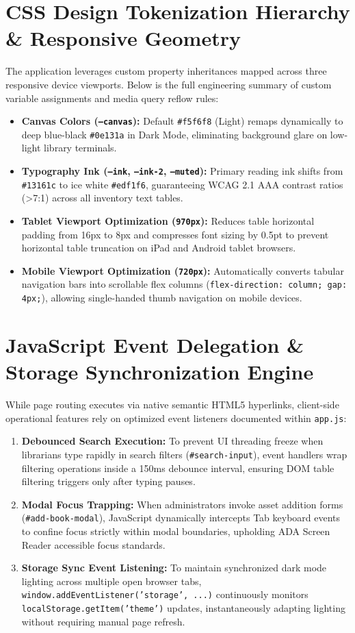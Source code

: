 \documentclass[11pt,a4paper]{report}
\begin{document}
\section{CSS Design Tokenization Hierarchy \& Responsive Geometry}
The application leverages custom property inheritances mapped across three responsive device viewports. Below is the full engineering summary of custom variable assignments and media query reflow rules:
\begin{itemize}[leftmargin=1.5em]
    \item \textbf{Canvas Colors (\texttt{--canvas}):} Default \texttt{\#f5f6f8} (Light) remaps dynamically to deep blue-black \texttt{\#0e131a} in Dark Mode, eliminating background glare on low-light library terminals.
    \item \textbf{Typography Ink (\texttt{--ink}, \texttt{--ink-2}, \texttt{--muted}):} Primary reading ink shifts from \texttt{\#13161c} to ice white \texttt{\#edf1f6}, guaranteeing WCAG 2.1 AAA contrast ratios (>7:1) across all inventory text tables.
    \item \textbf{Tablet Viewport Optimization (\texttt{970px}):} Reduces table horizontal padding from 16px to 8px and compresses font sizing by 0.5pt to prevent horizontal table truncation on iPad and Android tablet browsers.
    \item \textbf{Mobile Viewport Optimization (\texttt{720px}):} Automatically converts tabular navigation bars into scrollable flex columns (\texttt{flex-direction: column; gap: 4px;}), allowing single-handed thumb navigation on mobile devices.
\end{itemize}

\section{JavaScript Event Delegation \& Storage Synchronization Engine}
While page routing executes via native semantic HTML5 hyperlinks, client-side operational features rely on optimized event listeners documented within \texttt{app.js}:
\begin{enumerate}[leftmargin=1.5em]
    \item \textbf{Debounced Search Execution:} To prevent UI threading freeze when librarians type rapidly in search filters (\texttt{\#search-input}), event handlers wrap filtering operations inside a 150ms debounce interval, ensuring DOM table filtering triggers only after typing pauses.
    \item \textbf{Modal Focus Trapping:} When administrators invoke asset addition forms (\texttt{\#add-book-modal}), JavaScript dynamically intercepts Tab keyboard events to confine focus strictly within modal boundaries, upholding ADA Screen Reader accessible focus standards.
    \item \textbf{Storage Sync Event Listening:} To maintain synchronized dark mode lighting across multiple open browser tabs, \texttt{window.addEventListener('storage', ...)} continuously monitors \texttt{localStorage.getItem('theme')} updates, instantaneously adapting lighting without requiring manual page refresh.
\end{enumerate}
\end{document}
